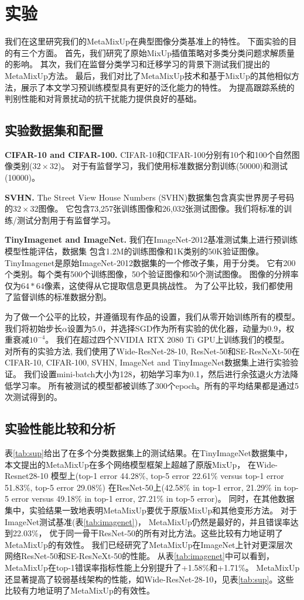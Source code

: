 \documentclass[promaster]{thesis-uestc}
\begin{document}
\section{实验}
我们在这里研究我们的MetaMixUp在典型图像分类基准上的特性。
下面实验的目的有三个方面。
首先，我们研究了原始MixUp插值策略对多类分类问题求解质量的影响。
其次，我们在监督分类学习和迁移学习的背景下测试我们提出的MetaMixUp方法。
最后，我们对比了MetaMixUp技术和基于MixUp的其他相似方法，展示了本文学习预训练模型具有更好的泛化能力的特性。
为提高跟踪系统的判别性能和对背景扰动的抗干扰能力提供良好的基础。
\subsection{实验数据集和配置}
\textbf{CIFAR-10 and CIFAR-100.}
CIFAR-10和CIFAR-100分别有10个和100个自然图像类别($32\times 32$)。
对于有监督学习，我们使用标准数据分割训练(50000)和测试(10000)。

\textbf{SVHN.}
The Street View House Numbers (SVHN)数据集包含真实世界房子号码的$32\times32$图像。
它包含73,257张训练图像和26,032张测试图像。我们将标准的训练/测试分割用于有监督学习。

\textbf{TinyImagenet and ImageNet.}
我们在ImageNet-2012基准测试集上进行预训练模型性能评估，数据集
包含1.2M的训练图像和1K类别的50K验证图像。
TinyImagenet是原始ImageNet-2012数据集的一个修改子集，用于分类。
它有200个类别。每个类有500个训练图像，50个验证图像和50个测试图像。
图像的分辨率仅为$64 * 64$像素，这使得从它提取信息更具挑战性。
为了公平比较，我们都使用了监督训练的标准数据分割。

为了做一个公平的比较，并遵循现有作品的设置，我们从零开始训练所有的模型。
我们将初始步长$\alpha$设置为5.0，并选择SGD作为所有实验的优化器，动量为0.9，权重衰减$10^{-4}$。
我们在超过四个NVIDIA RTX 2080 Ti GPU上训练我们的模型。
对所有的实验方法, 我们使用了Wide-ResNet-28-10, ResNet-50和SE-ResNeXt-50在
CIFAR-10, CIFAR-100, SVHN, ImageNet and TinyImageNet数据集上进行实验验证。 
我们设置mini-batch大小为128，初始学习率为0.1，然后进行余弦退火方法降低学习率。
所有被测试的模型都被训练了300个epoch。所有的平均结果都是通过5次测试得到的。

\subsection{实验性能比较和分析}
表\ref{tab:sup}给出了在多个分类数据集上的测试结果。在TinyImageNet数据集中，本文提出的MetaMixUp在多个网络模型框架上超越了原版MixUp，
在Wide-Resnet28-10 模型上(top-1 error 44.28\%, top-5 error 22.61\% versus top-1 error 51.83\%, top-5 error 29.08\%)
在ResNet-50上(42.58\% in top-1 error, 21.29\% in top-5 error versus 49.18\% in top-1 error, 27.21\% in top-5 error)。
同时，在其他数据集中，实验结果一致地表明MetaMixUp要优于原版MixUp和其他变形方法。
对于ImageNet测试基准(表\ref{tab:imagenet})， MetaMixUp仍然是最好的，并且错误率达到22.03\%，
优于同一骨干ResNet-50的所有对比方法。这些比较有力地证明了MetaMixUp的有效性。
我们已经研究了MetaMixUp在ImageNet上针对更深层次网络ResNet-50和SE-ResNeXt-50的性能。
从表\ref{tab:imagenet}中可以看到，MetaMixUp在top-1错误率指标性能上分别提升了+1.58\%和+1.71\%。
MetaMixUp还显著提高了较弱基线架构的性能，如Wide-ResNet-28-10，见表\ref{tab:sup}。这些比较有力地证明了MetaMixUp的有效性。
\end{document}
